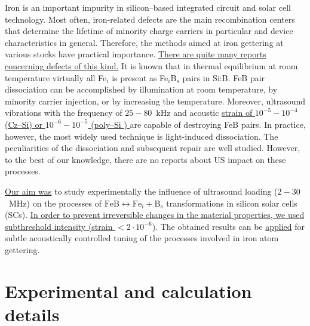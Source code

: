 \documentclass[%
 aip,jap,
 amsmath,amssymb,
 reprint,%
]{revtex4-1}
\begin{document}
Iron is an important impurity in silicon--based integrated circuit and solar cell technology.
Most often, iron-related defects are the main recombination centers that determine the lifetime of  minority charge carriers in particular and device characteristics in general.
Therefore, the methods aimed at iron gettering at various stocks have practical importance.
\textcolor[rgb]{0.00,0.07,1.00}{\uline{
There are quite many reports concerning defects of this kind.}}
It is known that in thermal equilibrium at room temperature virtually all Fe$_i$ is present as Fe$_i$B$_s$ pairs in Si:B.\cite{FeBLight2,FeBJAP2005}
FeB pair dissociation can be accomplished by illumination at room temperature, by minority carrier injection, or by increasing the temperature.\cite{FeBLight2,FeBAssJAP2014,FeB_Zong}
Moreover, ultrasound  vibrations with the frequency of $25-80$~kHz and acoustic
\textcolor[rgb]{0.00,0.07,1.00}{\uline{
strain of $10^{-5}-10^{-4}$ (Cz--Si\cite{Ostapenko1995})
or $10^{-6}-10^{-5}$ (poly--Si \cite{Ostapenko1995SST,Ostapenko1994APL})
}}
are capable of destroying FeB pairs.
In practice, however, the most widely used technique is light-induced dissociation.
The peculiarities of the dissociation and subsequent repair are well studied.\cite{FeBLight2,FeBKin2019,FeBAssJAP2014,FeBJAP2005,FeBAssSST2011,lauer2016,FeBStrongIll,FeBkinAPL2008,FeBKinAPL2013}
However, to the best of our knowledge, there are no reports about US impact on these processes.

\textcolor[rgb]{0.00,0.07,1.00}{\uline{
Our aim was}} to study experimentally the influence of ultrasound loading ($2-30$~MHz)
on the processes of $\mathrm{FeB}\leftrightarrow\mathrm{Fe}_i+\mathrm{B}_s$ transformations in silicon solar cells (SCs).
 \textcolor[rgb]{0.00,0.07,1.00}{\uline{In order to prevent irreversible changes in the material properties, we used subthreshold intensity (strain $<2\cdot10^{-6}$)}}.
The obtained results can be \textcolor[rgb]{0.00,0.07,1.00}{\uline{applied}} for subtle acoustically controlled tuning of the processes involved in iron atom gettering.


\section{\label{sec:Exp}Experimental and calculation details}
\end{document}
